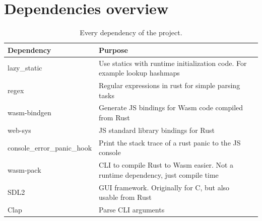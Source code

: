 \newpage
\section{Dependencies overview}
\begin{table}[ht]
  \begin{center}
    \centering
    \begin{tabularx}{\textwidth}{|l|X|X|}
      \toprule
      Dependency        & Purpose              \\ \midrule
      lazy\_static      & Use statics with runtime initialization code. For example lookup hashmaps \\ \midrule
      regex      & Regular expressions in rust for simple parsing tasks \\ \midrule
      wasm-bindgen      & Generate JS bindings for Wasm code compiled from Rust \\ \midrule
      web-sys      & JS standard library bindings for Rust \\ \midrule
      console\_error\_panic\_hook      & Print the stack trace of a rust panic to the JS console \\ \midrule
      wasm-pack      & CLI to compile Rust to Wasm easier. Not a runtime dependency, just compile time \\ \midrule
      SDL2      & GUI framework. Originally for C, but also usable from Rust \\ \midrule
      Clap      & Parse CLI arguments \\
      \bottomrule
    \end{tabularx}
    \caption{Every dependency of the project.}
    \label{table:dependencies}
  \end{center}
\end{table}

\newpage
